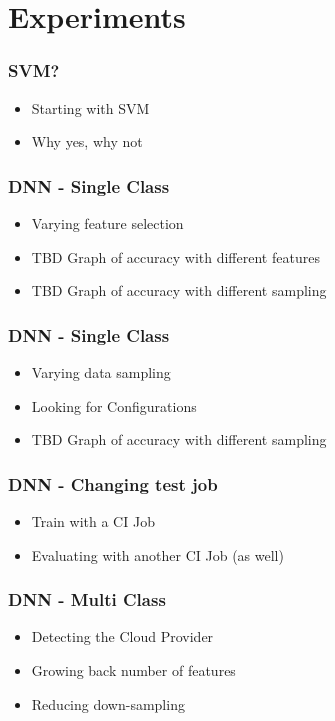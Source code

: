 \documentclass[aspectratio=169,11pt,hyperref={colorlinks=true}]{beamer}
\begin{document}
\section{Experiments}
\begin{frame}
    \frametitle{SVM?}
    \begin{itemize}
        \item{Starting with SVM}
        \item{Why yes, why not}
    \end{itemize}
\end{frame}

\begin{frame}
    \frametitle{DNN - Single Class}
    \begin{itemize}
        \item{Varying feature selection}
        \item{TBD Graph of accuracy with different features}
        \item{TBD Graph of accuracy with different sampling}
    \end{itemize}
\end{frame}

\begin{frame}
    \frametitle{DNN - Single Class}
    \begin{itemize}
        \item{Varying data sampling}
        \item{Looking for Configurations}
        \item{TBD Graph of accuracy with different sampling}
    \end{itemize}
\end{frame}

\begin{frame}
    \frametitle{DNN - Changing test job}
    \begin{itemize}
        \item{Train with a CI Job}
        \item{Evaluating with another CI Job (as well)}
    \end{itemize}
\end{frame}

\begin{frame}
    \frametitle{DNN - Multi Class}
    \begin{itemize}
        \item{Detecting the Cloud Provider}
        \item{Growing back number of features}
        \item{Reducing down-sampling}
    \end{itemize}
\end{frame}
\end{document}
